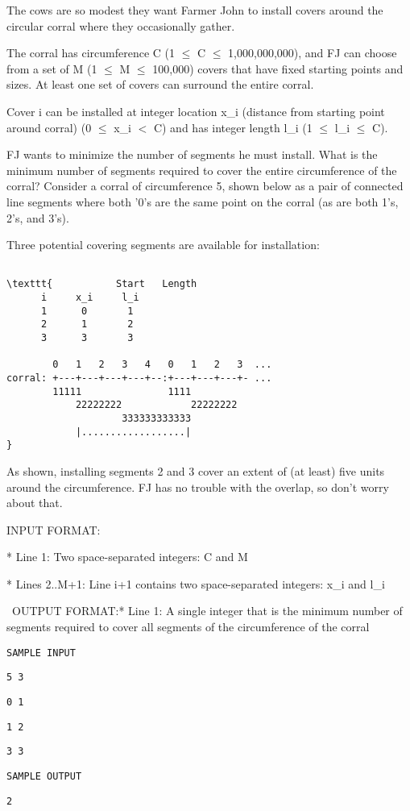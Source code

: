 

The cows are so modest they want Farmer John to install covers around the circular corral where they occasionally gather.

The corral has circumference C (1  $\le$  C  $\le$  1,000,000,000), and FJ can choose from a set of M (1  $\le$  M  $\le$  100,000) covers that have fixed starting points and sizes. At least one set of covers can surround the entire corral.

Cover i can be installed at integer location x\_i (distance from starting point around corral) (0  $\le$  x\_i $<$ C) and has integer length l\_i (1  $\le$  l\_i  $\le$  C).

FJ wants to minimize the number of segments he must install. What is the minimum number of segments required to cover the entire circumference of the corral? Consider a corral of circumference 5, shown below as a pair of connected line segments where both '0's are the same point on the corral (as are both 1's, 2's, and 3's).

Three potential covering segments are available for installation:
\begin{verbatim}

\texttt{           Start   Length
      i     x_i     l_i
      1      0       1 
      2      1       2 
      3      3       3 

        0   1   2   3   4   0   1   2   3  ... 
corral: +---+---+---+---+--:+---+---+---+- ...
        11111               1111
            22222222            22222222
                    333333333333
            |..................|
}\end{verbatim}

As shown, installing segments 2 and 3 cover an extent of (at least) five units around the circumference. FJ has no trouble with the overlap, so don't worry about that.

INPUT FORMAT:

* Line 1: Two space-separated integers: C and M

* Lines 2..M+1: Line i+1 contains two space-separated integers: x\_i and l\_i

 OUTPUT FORMAT:* Line 1: A single integer that is the minimum number of segments required to cover all segments of the circumference of the corral


\texttt{SAMPLE INPUT}


\texttt{5 3}


\texttt{0 1}


\texttt{1 2}


\texttt{3 3}


\texttt{SAMPLE OUTPUT}


\texttt{2 }
